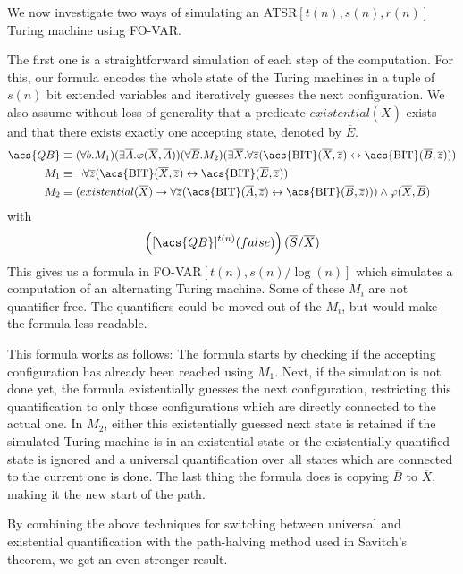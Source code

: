 We now investigate two ways of simulating an \acs{ATSR}$[t(n), s(n), r(n)]$ Turing machine using \acs{FO-VAR}\@.

The first one is a straightforward simulation of each step of the computation.
For this, our formula encodes the whole state of the Turing machines in a tuple of $s(n)$ bit extended variables and iteratively guesses the next configuration.
We also assume without loss of generality that a predicate $existential(\overline{X})$ exists and that there exists exactly one accepting state, denoted by $\overline{E}$.
\[
    \begin{aligned}
        \acs{QB} \equiv~&(\forall b.M_{1})(\exists\overline{A}.\varphi(\overline{X}, \overline{A}))(\forall \overline{B}.M_{2})(\exists \overline{X}. \forall \overline{z}(\text{\acs{BIT}}(\overline{X}, \overline{z}) \leftrightarrow \text{\acs{BIT}}(\overline{B}, \overline{z}))) \\
        M_{1} \equiv~&\neg\forall \overline{z}(\text{\acs{BIT}}(\overline{X}, \overline{z}) \leftrightarrow \text{\acs{BIT}}(\overline{E}, \overline{z})) \\
        M_{2} \equiv~& (existential(\overline{X}) \to \forall \overline{z}(\text{\acs{BIT}}(\overline{A}, \overline{z}) \leftrightarrow \text{\acs{BIT}}(\overline{B}, \overline{z}))) \land \varphi(\overline{X}, \overline{B})
    \end{aligned}
\]
with \[
         \left([\acs{QB}]^{t(n)}(false)\right)(\overline{S} / \overline{X})
\]
This gives us a formula in \acs{FO-VAR}$[t(n), s(n)/\log(n)]$ which simulates a computation of an alternating Turing machine.
Some of these $M_i$ are not quantifier-free.
The quantifiers could be moved out of the $M_i$, but would make the formula less readable.

This formula works as follows:
The formula starts by checking if the accepting configuration has already been reached using $M_1$.
Next, if the simulation is not done yet, the formula existentially guesses the next configuration, restricting this quantification to only those configurations which are directly connected to the actual one.
In $M_2$, either this existentially guessed next state is retained if the simulated Turing machine is in an existential state or the existentially quantified state is ignored and a universal quantification over all states which are connected to the current one is done.
The last thing the formula does is copying $\overline{B}$ to $\overline{X}$, making it the new start of the path.

By combining the above techniques for switching between universal and existential quantification with the path-halving method used in Savitch's theorem, we get an even stronger result.

